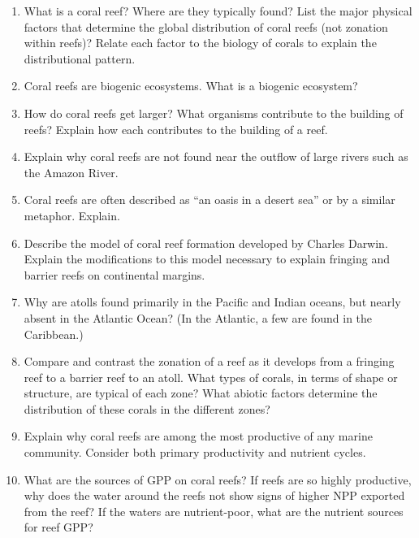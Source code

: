 \documentclass[nofonts, letterpaper]{tufte-handout}
\begin{document}
\begin{enumerate}

 \item
 What is a coral reef?  Where are they typically found? List
 the major physical factors that determine the global distribution
 of coral reefs (not zonation within reefs)? Relate each factor to the
 biology of corals to explain the distributional pattern.

\item
  Coral reefs are biogenic ecosystems. What is a biogenic ecosystem? 
  
\item
  How do coral reefs get larger?  What organisms contribute to the 
  building of reefs?  Explain how each contributes to the building of a reef.

\item
  Explain why coral reefs are not found near the outflow of large 
  rivers such as the Amazon River.

\item
  Coral reefs are often described as ``an oasis in a desert sea'' or 
  by a similar metaphor.  Explain.

\item
  Describe the model of coral reef formation developed by Charles
  Darwin.  Explain the modifications to this model necessary to 
  explain fringing and barrier reefs on continental margins.

\item
  Why are atolls found primarily in the Pacific and Indian oceans, 
  but nearly absent in the Atlantic Ocean?  (In the Atlantic, a few are
  found in the Caribbean.)

\item
  Compare and contrast the zonation of a reef as it develops from a 
  fringing reef to a barrier reef to an atoll.  What types of corals, in 
  terms of shape or structure, are typical of each zone?  What abiotic
  factors determine the distribution of these corals in the different zones?

\item
  Explain why coral reefs are among the most productive of any marine 
  community.  Consider both primary productivity and nutrient cycles.

\item
  What are the sources of GPP on coral reefs? If reefs are so highly
  productive, why does the water around the reefs not show signs of
  higher NPP exported from the reef? If the waters are nutrient-poor,
  what are the nutrient sources for reef GPP?


\end{enumerate}
\end{document}
